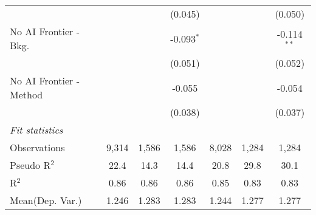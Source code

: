 \begin{tabular}{lcccccc}
                           &         &              & (0.045)       &         &              & (0.050)\\   
   No AI Frontier - Bkg.   &         &              & -0.093$^{*}$  &         &              & -0.114$^{**}$\\   
                           &         &              & (0.051)       &         &              & (0.052)\\   
   No AI Frontier - Method &         &              & -0.055        &         &              & -0.054\\   
                           &         &              & (0.038)       &         &              & (0.037)\\   
   \midrule
   \emph{Fit statistics}\\
   Observations            & 9,314   & 1,586        & 1,586         & 8,028   & 1,284        & 1,284\\  
   Pseudo R$^2$            & 22.4    & 14.3         & 14.4          & 20.8    & 29.8         & 30.1\\  
   R$^2$                   & 0.86    & 0.86         & 0.86          & 0.85    & 0.83         & 0.83\\  
Mean(Dep. Var.) & 1.246 & 1.283 & 1.283 & 1.244 & 1.277 & 1.277 \\
   

\end{tabular}
